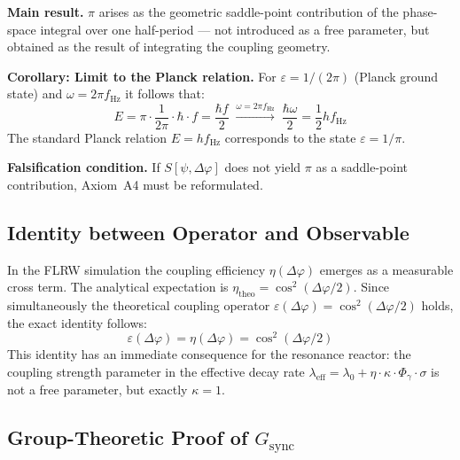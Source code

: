 \documentclass[12pt]{iopart}
\begin{document}
	\textbf{Main result.}
	$\pi$ arises as the geometric saddle-point contribution
	of the phase-space integral over one half-period — not
	introduced as a free parameter, but obtained as the result
	of integrating the coupling geometry.
	
	\textbf{Corollary: Limit to the Planck relation.}
	For $\varepsilon = 1/(2\pi)$ (Planck ground state)
	and $\omega = 2\pi f_{\mathrm{Hz}}$ it follows that:
	\begin{equation}
		E = \pi\cdot\frac{1}{2\pi}\cdot\hbar\cdot f
		= \frac{\hbar f}{2}
		\;\xrightarrow{\omega = 2\pi f_{\mathrm{Hz}}}\;
		\frac{\hbar\omega}{2}
		= \frac{1}{2}h f_{\mathrm{Hz}}
		\label{eq:planck_limit}
	\end{equation}
	The standard Planck relation $E = hf_{\mathrm{Hz}}$
	corresponds to the state $\varepsilon = 1/\pi$.
	
	\textbf{Falsification condition.}
	If $S[\psi, \Delta\varphi]$ does not yield $\pi$ as a
	saddle-point contribution, Axiom~A4 must be reformulated.
	
	\subsection{Identity between Operator and Observable}
	\label{sec:eps_eta}
	
	In the FLRW simulation the coupling efficiency
	$\eta(\Delta\varphi)$ emerges as a measurable cross term.
	The analytical expectation is
	$\eta_{\mathrm{theo}} = \cos^2(\Delta\varphi/2)$.
	Since simultaneously the theoretical coupling operator
	$\varepsilon(\Delta\varphi) = \cos^2(\Delta\varphi/2)$
	holds, the exact identity follows:
	\begin{equation}
		\varepsilon(\Delta\varphi)
		= \eta(\Delta\varphi)
		= \cos^2(\Delta\varphi/2)
		\label{eq:eps_eta_identity}
	\end{equation}
	This identity has an immediate consequence for the
	resonance reactor: the coupling strength parameter
	in the effective decay rate
	$\lambda_{\mathrm{eff}} = \lambda_0 + \eta \cdot \kappa
	\cdot \Phi_\gamma \cdot \sigma$ is not a free parameter,
	but exactly $\kappa = 1$.
	
	\subsection{Group-Theoretic Proof of $G_{\mathrm{sync}}$}
	\label{sec:gsync}
	
\end{document}
